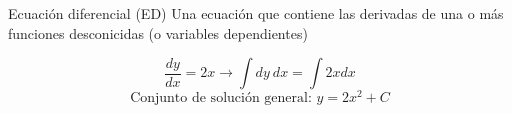 \documentclass[letterpaper]{article}
\def \T{Programación de Modelos en\\Ecuaciones Diferenciales}
\def \S{2025-01-13}
\begin{document}
\vspace{16pt}

\begin{defbox}{Ecuación diferencial (ED)}
  Una ecuación que contiene las derivadas de una o más funciones desconicidas (o variables dependientes)
  \begin{center}
    \[
      \frac{dy}{dx} = 2x 
      \to
      \int dy ~dx = \int 2xdx
    \]
    \[
      \text{Conjunto de solución general: } y = 2x^{2} + C
    \]
  \end{center}
\end{defbox}
\end{document}
